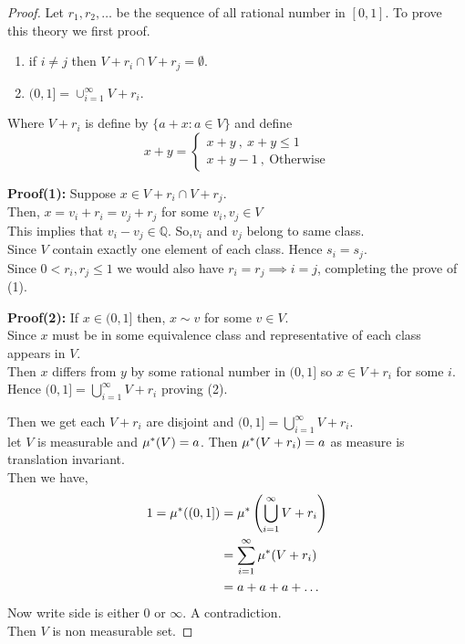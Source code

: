 \begin{proof}
    Let $r_1,r_2,\ldots$ be the sequence of all rational number in $[0,1]$. To prove this theory we first proof.
     \begin{enumerate}
         \item if $i\neq j$ then $V+r_i\cap V+r_j=\emptyset$.
         \item $(0,1]=\cup_{i=1}^{\infty}V+r_i$.
    \end{enumerate}
    Where $V+r_i$ is define by  $\{a+x:a\in V\}$ and define 
     $$x+y=
     \begin{cases}
        x+y \ ,\ x+y\le 1 \\
        x+y-1\ ,\ \text{Otherwise}
    \end{cases}
    $$

    \textbf{Proof(1):} Suppose $x\in V+r_i\cap V+r_j$.\\
    Then,  $x=v_i+r_i=v_j+r_j$ for some  $v_i,v_j\in V$ \\
    This implies that $v_i-v_j\in \mathds{Q}$. So,$v_i$ and  $v_j$ belong to same class.\\
    Since  $V$ contain exactly one element of each class. Hence $s_i=s_j$.\\
    Since  $0<r_i,r_j\le 1$ we would also have $r_i=r_j\implies i=j$, completing the prove of (1).

    \textbf{Proof(2):} If  $x\in(0,1]$ then,  $x\sim v$ for some  $v\in V$.\\
    Since  $x$ must be in some equivalence class and representative of each class appears in  $V$.\\ Then $x$ differs from  $y$ by some rational number in  $(0,1]$
    so  $x\in V+r_i$ for some  $i$.\\
    Hence  $(0,1]=\bigcup_{i=1}^{\infty}V+r_i$ proving (2).

    Then we get each $V+r_i$ are disjoint and  $(0,1]=\bigcup_{i=1}^{\infty}V+r_i$.\\
    let $V$ is measurable and  $\mu^{*}(V)=a$. Then  $\mu^{*}(V+r_i)=a$ as measure is translation invariant.\\
    Then we have, 
    \begin{align*}
        1=\mu^{*}((0,1])&=\mu^{*}\left( \bigcup_{i=1}^{\infty}V+r_i \right) \\
                     &=\sum_{i=1}^{\infty}\mu^{*}(V+r_i)\\
                     &= a+a+a+\ldots 
    \end{align*}
    Now write side is either $0$ or  $\infty$. A contradiction.\\
    Then $V$ is non measurable set.
\end{proof}
